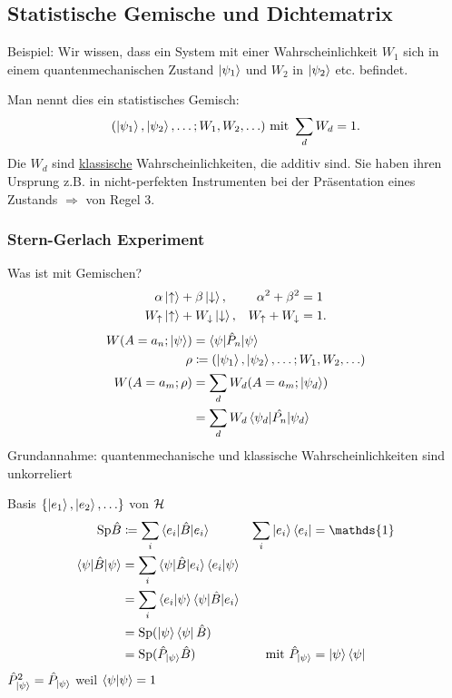 \subsection{Statistische Gemische und Dichtematrix}
	Beispiel: Wir wissen, dass ein System mit einer Wahrscheinlichkeit $W_1$ sich in einem quantenmechanischen Zustand $\ket{\psi_1}$ und $W_2$ in $\ket{\psi_2}$ etc. befindet.
	
	Man nennt dies ein statistisches Gemisch:
		\begin{align*}
			(\ket{\psi_1}, \ket{\psi_2}, \ldots; W_1, W_2, \ldots) \text{ mit } \sum_d W_{d} = 1.
		\end{align*}
	Die $W_d$ sind \underline{klassische} Wahrscheinlichkeiten, die additiv sind. Sie haben ihren Ursprung z.B. in nicht-perfekten Instrumenten bei der Präsentation eines Zustands
	$\Rightarrow$ von Regel 3.
	\subsubsection*{Stern-Gerlach Experiment}
	Was ist mit Gemischen?
	\begin{align*}
		\alpha \ket{\uparrow} &+ \beta \ket{\downarrow},& \alpha^2 + \beta^2 &= 1 \\
		W_\uparrow\ket{\uparrow} &+ W_\downarrow \ket{\downarrow},& W_\uparrow + W_\downarrow &= 1.
	\end{align*}
	\begin{align*}
		W(A = a_n; \ket{\psi}) &= \braket{\psi | \hat{P}_n | \psi} \\
		\rho &\coloneqq (\ket{\psi_1}, \ket{\psi_2}, \ldots; W_1, W_2, \ldots) \\
		W(A=a_m; \rho) &= \sum_{d} W_d (A = a_m ; \ket{\psi_d}) \\
		&= \sum_d W_d \braket{\psi_d | \hat{P_n} | \psi_d} 
	\end{align*}
	Grundannahme: quantenmechanische und klassische Wahrscheinlichkeiten sind unkorreliert
	
	Basis $\{\ket{e_1}, \ket{e_2}, \ldots \}$ von $\mathcal{H}$
		\begin{align*}
			\mathrm{Sp } \hat{B} &\coloneqq \sum_i \braket{e_i | \hat{B} | e_i} &
			\sum_i \ket{e_i} \bra{e_i} &= \mathds{1} \\
			\braket{\psi| \hat{B} | \psi} &= 
			\sum_i \braket{\psi | \hat{B} | e_i} \braket{e_i | \psi} \\
			&= \sum_i \braket{e_i | \psi} \braket{\psi | \hat{B} | e_i} \\
			&= \mathrm{Sp }(\ket{\psi} \bra{\psi} \hat{B}) \\
			&= \mathrm{Sp } (\hat{P}_{\ket{\psi}} \hat{B}) &
			\text{mit } \hat{P}_{\ket{\psi}} &= \ket{\psi} \bra{\psi} 
		\end{align*}
	$\hat{P}^2_{\ket{\psi}} =\hat{P}_{\ket{\psi}}$ weil $\braket{\psi | \psi} = 1$
	

